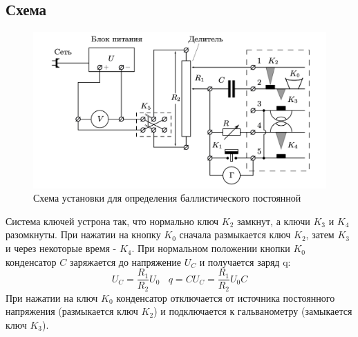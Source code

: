 \documentclass[a4paper,12pt]{article} %
\begin{document}
\subsection{Схема}
\begin{figure}[h!]
    \centering
    \includegraphics[width=0.8\linewidth]{Снимок экрана 2024-11-16 в 02.47.25.png}
    \caption{Схема установки для определения баллистического постоянной}
    \label{sheme-3}
\end{figure}
Система ключей устрона так, что нормально ключ $K_2$ замкнут, а ключи $K_3$ и $K_4$ разомкнуты. При нажатии на кнопку $K_0$ сначала размыкается ключ $K_2$, затем $K_3$ и через некоторые время - $K_4$. При нормальном положении кнопки $K_0$ конденсатор $C$ заряжается до напряжение $U_C$ и получается заряд q:
\[
U_C = \frac{R_1}{R_2} U_0 \ \ \ \ q = CU_C = \frac{R_1}{R_2}U_0C
\]
При нажатии на ключ $K_0$ конденсатор отключается от источника постоянного напряжения (размыкается ключ $K_2$) и подключается к гальванометру (замыкается ключ $K_3$).
\end{document}
